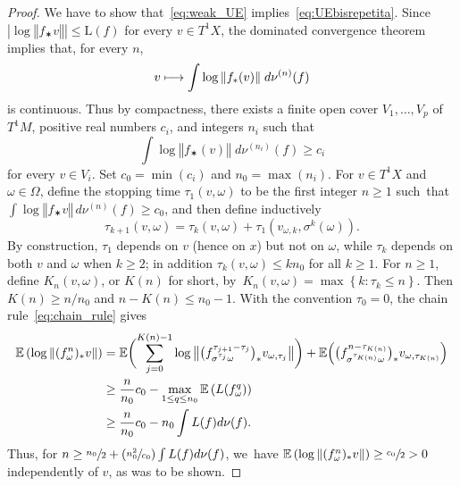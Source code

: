 \documentclass[11pt]{article}
\newcommand\mto{\mathchoice{\longmapsto}{\mapsto}{\mapsto}{\mapsto}}
\newcommand{\Psfrac}[2]{(\sfrac{#1}{#2})}
\let\sep :
\newcommand{\set}[1]{\left\{#1\right\}}
\newcommand{\norm}[1]{{\left\Vert#1\right\Vert}}
\newcommand{\bnorm}[1]{{\bigl\Vert#1\bigr\Vert}}
\newcommand{\abs}[1]{\left\vert#1\right\vert}
\newcommand{\lrpar}[1]{\left(#1\right)}
\newcommand{\blrpar}[1]{\bigl(#1\bigr)}
\newcommand{\Blrpar}[1]{\Bigl(#1\Bigr)}
\newcommand{\bblrpar}[1]{\biggl(#1\biggr)}
\newcommand{\ee}{\mathbb{E}}
\theoremstyle{plain}
\theoremstyle{definition}
\numberwithin{equation}{section}
\begin{document}
\begin{proof} We have to show that~\eqref{eq:weak_UE} implies~\eqref{eq:UEbisrepetita}.
Since $\abs{\log \norm{f_{\varstar}v}} \leq \mathrm L(f)$ for every $v\in T^1X$, the
dominated convergence theorem implies that, for every $n$,
\begin{equation*}
v\mto \int \log \norm {f_{\varstar}( v)} \; d\nu^{(n)}(f)
\end{equation*}
is continuous.
Thus by compactness, there exists a finite open cover $V_1, \ldots, V_p$ of $T^1M$, positive
real numbers $c_i$, and integers
$n_i$ such that
\begin{equation*}
\int \log \norm{f_\varstar ( v) } \; d\nu^{(n_i)}(f) \geq c_i
\end{equation*}
for every
$ v\!\in\! V_i$.
Set $c_0 \!=\! \min(c_i)$ and $n_0 \!=\! \max(n_i)$. For $ v\in T^1X$ and
$\omega\in \Omega$, define the stopping time $\tau_1( v, \omega)$ to
be the first integer $n\!\geq\! 1$ such~that~\hbox{$\int \log \norm{f_\varstar v } \, d\nu^{(n)}(f) \!\geq\! c_0$}, and then define inductively
\begin{equation*}
\tau_{k+1}( v, \omega) = \tau_k( v, \omega) + \tau_1( v_{\omega, k}, \sigma^k (\omega)).
\end{equation*}
By construction, $\tau_1$ depends on $v$ (hence on $x$) but not on $\omega$,
while $\tau_k$ depends on both $v$ and $\omega$ when $k\geq 2$; in addition
$\tau_k(v,\omega)\leq k n_0$ for all $k\geq 1$. For $n\geq 1$, define
$K_n( v,\omega)$, or $K(n)$ for short, by~$K_n( v,\omega)=\max\set{k \sep \tau_k \leq n}$. Then
$K(n) \geq n/n_0$ and $n- K(n)\leq n_0-1$.
With the convention $\tau_0 = 0$, the chain rule~\eqref{eq:chain_rule} gives
\begin{align*}\label{eq:stopping_bdd}
\notag\ee\lrpar{\log\norm{(f^n_\omega)_\varstar v}} &= \ee\bblrpar{\sum_{j = 0}^{K(n) -1} \log\bnorm{\blrpar{f_{\sigma^{\tau_j}\omega}^{\tau_{j+1} - \tau_j} }_\varstar v_{\omega, \tau_j}}} +
\ee\Blrpar{ \blrpar{f_{\sigma^{\tau_{K(n)}}\omega}^{n- \tau_{K(n)}} }_\varstar v_{\omega, \tau_{K(n)}}} \\
&\geq \frac{n}{n_0}c_0 - \max_{1\leq q\leq n_0} \ee\lrpar{ L (f_\omega^q) } \\
&\geq \frac{n}{n_0}c_0 - n_0 \int L(f)d\nu(f).
\end{align*}
Thus, for $n\geq \sfrac{n_0}{2} + \Psfrac{n_0^2}{c_0}\int L(f)d\nu(f)$, we~have $\ee\lrpar{\log\norm{(f^n_\omega)_\varstar v}} \geq \sfrac{c_0}{2}>0$ independently of $ v$, as was to be shown.
\end{proof}
\end{document}
